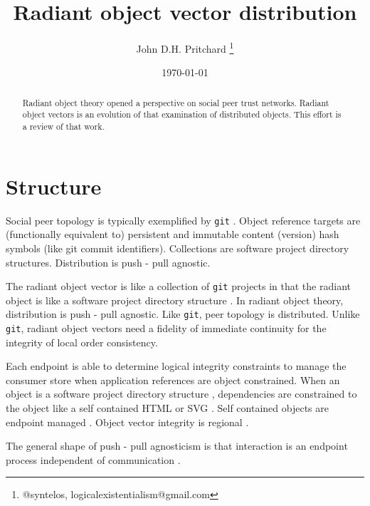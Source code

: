 \documentclass[12pt,twocolumn]{article}
\begin{document}
\title{Radiant object vector distribution}

\author{John D.H. Pritchard \thanks{@syntelos, logicalexistentialism@gmail.com}}

\date{\today}

\maketitle


\begin{abstract}

Radiant object theory \cite{ROTI,ROTY,ROTA,ROTC,ROTS,ROTN} opened a
perspective on social peer trust networks.  Radiant object vectors
\cite{ROVI} is an evolution of that examination of distributed
objects.  This effort is a review of that work.
  
\end{abstract}


\section{Structure}

Social peer topology is typically exemplified by {\tt git} \cite{GIT}.
Object reference targets are (functionally equivalent to) persistent
and immutable content (version) hash symbols (like git commit
identifiers).  Collections are software project directory structures.
Distribution is push - pull agnostic.

The radiant object vector is like a collection of {\tt git} projects
in that the radiant object is like a software project directory
structure \cite{ROTI, ROVI}.  In radiant object theory, distribution
is push - pull agnostic.  Like {\tt git}, peer topology is
distributed.  Unlike {\tt git}, radiant object vectors need a fidelity
of immediate continuity for the integrity of local order consistency.

Each endpoint is able to determine logical integrity constraints to
manage the consumer store when application references are object
constrained.  When an object is a software project directory structure
\cite{MIME}, dependencies are constrained to the object like a self
contained HTML or SVG \cite{HTML,SVG}.  Self contained objects are
endpoint managed \cite{DTN,PKG}.  Object vector integrity is regional
\cite{ROVI}.

The general shape of push - pull agnosticism is that interaction is an
endpoint process independent of communication \cite{ROTA}.
\end{document}
